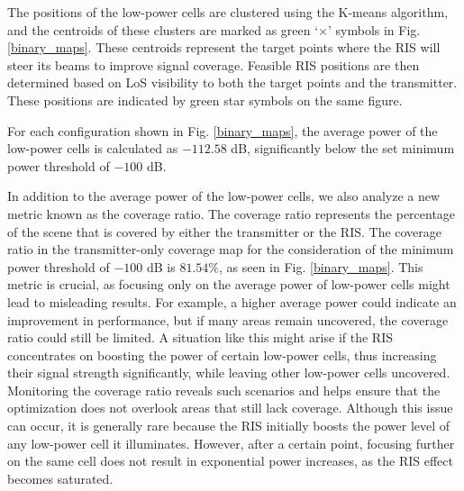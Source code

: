 \documentclass{IEEEoj}
\begin{document}
The positions of the low-power cells are clustered using the K-means algorithm, and the centroids of these clusters are marked as green `$\times$' symbols in Fig. \ref{binary_maps}. These centroids represent the target points where the RIS will steer its beams to improve signal coverage. Feasible RIS positions are then determined based on LoS visibility to both the target points and the transmitter. These positions are indicated by green star symbols on the same figure.

For each configuration shown in Fig. \ref{binary_maps}, the average power of the low-power cells is calculated as $-112.58$ dB, significantly below the set minimum power threshold of $-100$ dB.

In addition to the average power of the low-power cells, we also analyze a new metric known as the coverage ratio. The coverage ratio represents the percentage of the scene that is covered by either the transmitter or the RIS. The coverage ratio in the transmitter-only coverage map for the consideration of the minimum power threshold of $-100$ dB is $81.54\%$, as seen in Fig. \ref{binary_maps}. This metric is crucial, as focusing only on the average power of low-power cells might lead to misleading results. For example, a higher average power could indicate an improvement in performance, but if many areas remain uncovered, the coverage ratio could still be limited. A situation like this might arise if the RIS concentrates on boosting the power of certain low-power cells, thus increasing their signal strength significantly, while leaving other low-power cells uncovered. Monitoring the coverage ratio reveals such scenarios and helps ensure that the optimization does not overlook areas that still lack coverage. Although this issue can occur, it is generally rare because the RIS initially boosts the power level of any low-power cell it illuminates. However, after a certain point, focusing further on the same cell does not result in exponential power increases, as the RIS effect becomes saturated.
\end{document}
